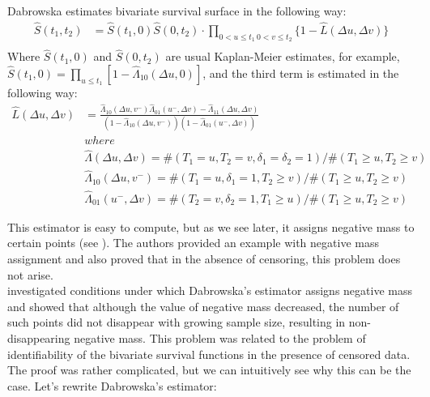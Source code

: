 \documentclass[]{article}
\begin{document}
Dabrowska estimates bivariate survival surface in the following way:
	$$
	\begin{aligned}
		\hat{S}(t_1,t_2) &= \hat{S}(t_1,0)\hat{S}(0,t_2)\cdot \prod_{{0<u\leq t_1~0<v\leq t_2}}\{1 - \hat{L}(\Delta u, \Delta v)\}\\
	\end{aligned}
	$$
Where $\hat{S}(t_1,0)$ and $\hat{S}(0,t_2)$ are usual Kaplan-Meier estimates, for example, $\hat{S}(t_1,0) = \prod_{u\leq t_1}[1-\hat{\Lambda}_{10}(\Delta u, 0)]$, and the third term is estimated in the following way:
	$$
	\begin{aligned}
    \hat{L}(\Delta u, \Delta v) &= \frac{\hat{\Lambda}_{10}(\Delta u,v^-)\hat{\Lambda}_{01}(u^-,\Delta v) - \hat{\Lambda}_{11}(\Delta u,\Delta v)}{\left(1-\hat{\Lambda}_{10}(\Delta u,v^-)\right)\left(1-\hat{\Lambda}_{01}(u^-,\Delta v)\right)}\\
  &where\\
	&\hat{\Lambda}(\Delta u, \Delta v) = \#(T_1=u, T_2=v, \delta_1=\delta_2=1)/\#(T_1\geq u, T_2\geq v)\\
	&\hat{\Lambda}_{10}(\Delta u, v^-) = \#(T_1=u, \delta_1=1, T_2\geq v)/\#(T_1\geq u, T_2\geq v)\\
	&\hat{\Lambda}_{01}(u^-,\Delta  v) = \#(T_2=v, \delta_2=1, T_1\geq u)/\#(T_1\geq u, T_2\geq v)
	\end{aligned}
	$$

This estimator is easy to compute, but as we see later, it assigns negative mass to certain points (see ). The authors provided an example with negative mass assignment and also proved that in the absence of censoring, this problem does not arise.\\

\cite{pruitt1991negative} investigated conditions under which Dabrowska's estimator assigns negative mass and showed that although the value of negative mass decreased, the number of such points did not disappear with growing sample size, resulting in non-disappearing negative mass. This problem was related to the problem of identifiability of the bivariate survival functions in the presence of censored data. The proof was rather complicated, but we can intuitively see why this can be the case. Let's rewrite Dabrowska's estimator:
\end{document}
